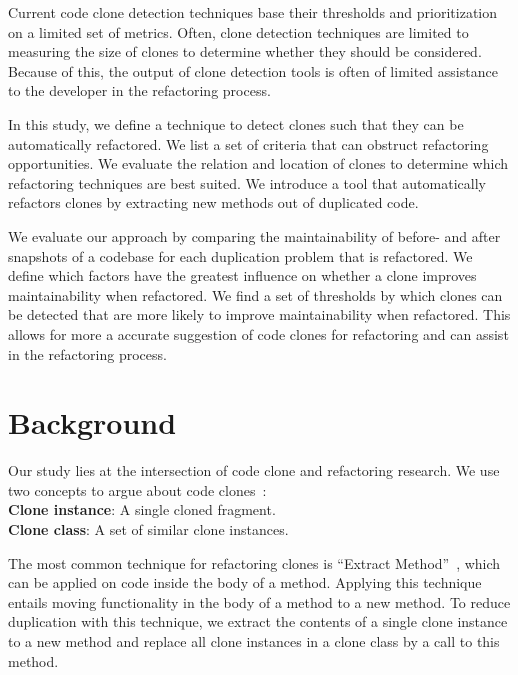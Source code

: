 \documentclass[]{IEEEtran}
\begin{document}
Current code clone detection techniques base their thresholds and prioritization on a limited set of metrics. Often, clone detection techniques are limited to measuring the size of clones to determine whether they should be considered. Because of this, the output of clone detection tools is often of limited assistance to the developer in the refactoring process.

In this study, we define a technique to detect clones such that they can be automatically refactored. We list a set of criteria that can obstruct refactoring opportunities. We evaluate the relation and location of clones to determine which refactoring techniques are best suited. We introduce a tool that automatically refactors clones by extracting new methods out of duplicated code.

We evaluate our approach by comparing the maintainability of before- and after snapshots of a codebase for each duplication problem that is refactored. We define which factors have the greatest influence on whether a clone improves maintainability when refactored. We find a set of thresholds by which clones can be detected that are more likely to improve maintainability when refactored. This allows for more a accurate suggestion of code clones for refactoring and can assist in the refactoring process.

\section{Background}
Our study lies at the intersection of code clone and refactoring research. We use two concepts to argue about code clones~\cite{roy2007survey}:
\\ \textbf{Clone instance}: A single cloned fragment.
\\ \textbf{Clone class}: A set of similar clone instances.

The most common technique for refactoring clones is ``Extract Method''~\cite{fowler2018refactoring}, which can be applied on code inside the body of a method. Applying this technique entails moving functionality in the body of a method to a new method. To reduce duplication with this technique, we extract the contents of a single clone instance to a new method and replace all clone instances in a clone class by a call to this method.
\end{document}
